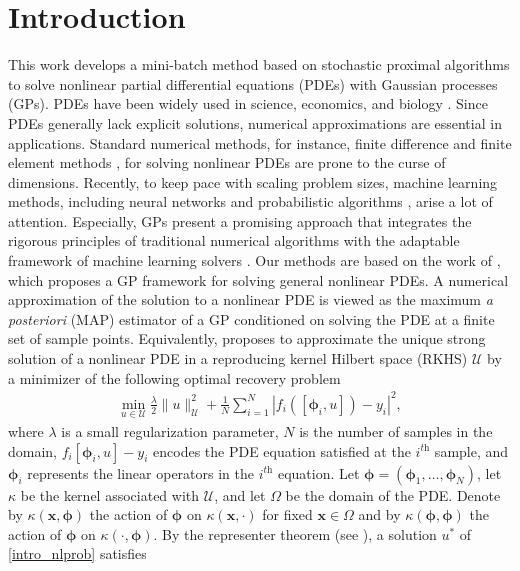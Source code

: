\documentclass[10pt,reqno]{amsart}
\newcommand{\1}{{\chi}}
\numberwithin{equation}{section}
\theoremstyle{thmlemcorr}
\numberwithin{theorem}{section}
\theoremstyle{thmlemcorr*}
\theoremstyle{defi}
\theoremstyle{remexample}
\theoremstyle{ass}
\begin{document}
\section{Introduction}
	This work develops a mini-batch method based on stochastic proximal algorithms \cite{davis2019stochastic, asi2019importance, asi2019stochastic} to solve nonlinear partial differential equations (PDEs) with Gaussian processes (GPs). PDEs have been widely used in science, economics, and biology \cite{quarteroni2008numerical, thomas2013numerical}. Since PDEs generally lack explicit solutions, numerical approximations are essential in applications. Standard numerical methods, for instance, finite difference \cite{thomas2013numerical} and finite element methods \cite{hughes2012finite},  for solving nonlinear PDEs are prone to the curse of dimensions. Recently, to keep pace with scaling problem sizes, machine learning methods,  including neural networks \cite{raissi2019physics, zang2020weak, lu2021learning, mao2020physics, karniadakis2021physics} and probabilistic algorithms \cite{cockayne2017probabilistic, raissi2018numerical, kramer2021probabilistic, wang2021bayesian, chen2021solving}, arise a lot of attention. Especially, GPs present a promising approach that integrates the rigorous principles of traditional numerical algorithms with the adaptable framework of machine learning solvers \cite{raissi2018numerical, chen2021solving, wang2021bayesian, batlle2023error}. Our methods are based on the work of \cite{chen2021solving}, which proposes a GP framework for solving general nonlinear PDEs. A numerical approximation of the solution to a nonlinear PDE is viewed as the maximum \textit{a posteriori} (MAP) estimator of a GP conditioned on solving the PDE at a finite set of sample points. Equivalently, \cite{chen2021solving} proposes to approximate the unique strong solution of a nonlinear PDE in a reproducing kernel Hilbert space (RKHS) $\mathcal{U}$ by a minimizer of the following optimal recovery problem
\begin{align}
	\label{intro_nlprob}
	\min_{u\in \mathcal{U}}\frac{\lambda}{2}\|u\|_{\mathcal{U}}^2 + \frac{1}{N}\sum_{i=1}^N|f_i([\boldsymbol{\phi}_i, u])-{y}_i|^2,
\end{align}
where  $\lambda$ is a small regularization parameter, $N$ is the number of samples  in the domain, $f_i[\boldsymbol{\phi}_i, u]-y_i$ encodes the PDE equation satisfied at the $i^{\textit{th}}$ sample, and $\boldsymbol{\phi}_i$ represents the linear operators in the $i^{\textit{th}}$ equation. Let $\boldsymbol{\phi}=(\boldsymbol{\phi}_1,\dots, \boldsymbol{\phi}_N)$, let $\kappa$ be the kernel associated with  $\mathcal{U}$, and let $\Omega$ be the domain of the PDE. Denote by $\kappa(\boldsymbol{x}, \boldsymbol{\phi})$ the action of $\boldsymbol{\phi}$ on $\kappa(\boldsymbol{x},\cdot)$ for fixed $\boldsymbol{x}\in \Omega$ and by $\kappa(\boldsymbol{\phi}, \boldsymbol{\phi})$ the action of $\boldsymbol{\phi}$ on $\kappa(\cdot, \boldsymbol{\phi})$.    By the representer theorem (see \cite[Sec. 17.8]{owhadi2019operator}), a solution $u^*$ of \eqref{intro_nlprob} satisfies
\end{document}
